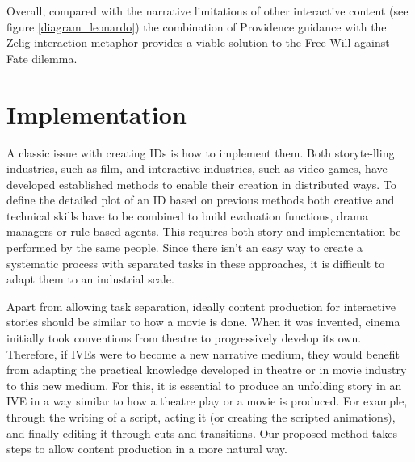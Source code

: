 \documentclass[
		twoside,openright,titlepage,numbers=noenddot,manychapters,
		headinclude,%
                footinclude=false,cleardoublepage=empty,
                BCOR=5mm,
		fontsize=11pt, %
                 enabledeprecatedfontcommands]{scrreprt}
\begin{document}
Overall, compared with the narrative limitations of other interactive content (see figure \ref{diagram_leonardo}) the combination of Providence guidance with the Zelig interaction metaphor provides a viable solution to the Free Will against Fate dilemma.



\section{ Implementation}
A classic issue with creating IDs is how to implement them. Both storyte-lling industries, such as film, and interactive industries, such as video-games, have developed established methods to enable their creation in distributed ways. To define the detailed plot of an ID based on previous methods both creative and technical skills have to be combined to build evaluation functions, drama managers or rule-based agents. This requires both story and implementation be performed by the same people. Since there isn’t an easy way to create a systematic process with separated tasks in these approaches, it is difficult to adapt them to an industrial scale. 

Apart from allowing task separation, ideally content production for interactive stories should be similar to how a movie is done. When it was invented, cinema initially took conventions from theatre to progressively develop its own. Therefore, if IVEs were to become a new narrative medium, they would benefit from adapting the practical knowledge developed in theatre or in movie industry to this new medium. For this, it is essential to produce an unfolding story in an IVE in a way similar to how a theatre play or a movie is produced. For example, through the writing of a script, acting it (or creating the scripted animations), and finally editing it through cuts and transitions. Our proposed method takes steps to allow content production in a more natural way.
\end{document}
